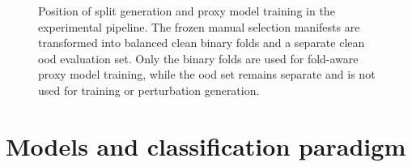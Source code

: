 \begin{figure}[H]
{%
}
\caption[Split generation and proxy model training position in the pipeline]{Position of split generation and proxy model training in the experimental pipeline. The frozen manual selection manifests are transformed into balanced clean binary folds and a separate clean \gls{ood} evaluation set. Only the binary folds are used for fold-aware proxy model training, while the \gls{ood} set remains separate and is not used for training or perturbation generation.}
\label{fig:methodology-split-to-proxy-training}
\end{figure}


\section{Models and classification paradigm}
\label{sec:methodology-models-classification}

